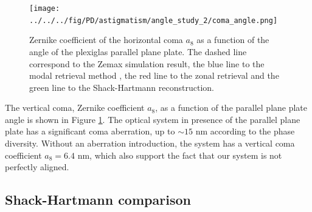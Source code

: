 \begin{figure}
\begin{center}
\texttt{[image: ../../../fig/PD/astigmatism/angle\_study\_2/coma\_angle.png]}
\decoRule
\caption{Zernike coefficient of the horizontal coma $a_8$ as a function of the angle of the plexiglas parallel plane plate. The dashed line correspond to the Zemax simulation result, the blue line to the modal retrieval method , the red line to the zonal retrieval and the green line to the Shack-Hartmann reconstruction.}
\label{fig:a8astigmatism_angle_Diversity}
\end{center}
\end{figure}

The vertical coma, Zernike coefficient $a_8$, as a function of the parallel plane plate angle is shown in Figure \ref{fig:a8astigmatism_angle_Diversity}. The optical system in presence of the parallel plane plate has a significant coma aberration, up to $\sim15$ nm according to the phase diversity. Without an aberration introduction, the system has a vertical coma coefficient $a_8=6.4$ nm, which also support the fact that our system is not perfectly aligned. 

\subsection{Shack-Hartmann comparison}

